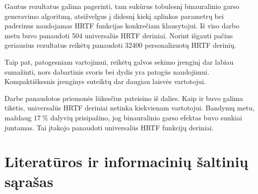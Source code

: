\documentclass[]{vgtuef}
\begin{document}
Gautus rezultatus galima pagerinti, tam sukūrus tobulesnį binauralinio garso generavimo algoritmą, atsižvelgus į didesnį kiekį aplinkos parametrų bei paderinus naudojamas HRTF funkcijas konkrečiam klausytojui. Iš viso darbo metu buvo panaudoti 504 universalūs HRTF deriniai. Norint išgauti pačius geriausius rezultatus reikėtų panaudoti 32400 personalizuotų HRTF derinių.

Taip pat, patogesniam vartojimui, reikėtų galvos sekimo įrenginį dar labiau sumažinti, nors dabartinis svoris bei dydis yra patogūs naudojimui. Kompaktiškesnis įrenginys suteiktų dar daugiau laisvės vartotojui.


Darbe panaudotos priemonės lūkesčius pateisino iš dalies. Kaip ir buvo galima tikėtis, universalūs HRTF deriniai netinka kiekvienam vartotojui. Bandymų metu, maždaug $17~\%$ dalyvių prisipažino, jog binauralinio garso efektas buvo sunkiai juntamas. Tai įtakojo panaudoti universalūs HRTF funkcijų deriniai.

\section{Literatūros ir informacinių šaltinių sąrašas}
\end{document}
